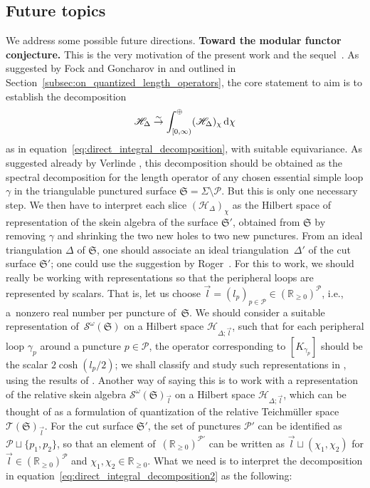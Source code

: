 \documentclass[10pt,a4paper]{amsart}
\numberwithin{equation}{section}
\theoremstyle{definition}
\begin{document}
\subsection{Future topics}\label{subsec:future_topics} We address some possible future directions.
{\bf Toward the modular functor conjecture.}
This is the very motivation of the present work and the sequel~\cite{sequel}. As suggested by Fock and Goncharov in \cite{FG09} and outlined in Section~\ref{subsec:on_quantized_length_operators}, the core statement to aim is to establish the decomposition
\begin{align}
\label{eq:direct_integral_decomposition2}
\mathscr{H}_\Delta \stackrel{\sim}{\to} \int_{[0,\infty)}^\oplus (\mathscr{H}_\Delta)_\chi \, {\rm d}\chi
\end{align}
as in equation~\eqref{eq:direct_integral_decomposition}, with suitable equivariance. As suggested already by Verlinde \cite{Verlinde}, this decomposition should be obtained as the spectral decomposition for the length operator  of any chosen essential simple loop $\gamma$ in the triangulable punctured surface $\mathfrak{S} = \Sigma\setminus \mathcal{P}$. But this is only one necessary step. We then have to interpret each slice $(\mathscr{H}_\Delta)_\chi$ as the Hilbert space of representation of the skein algebra of the surface $\mathfrak{S}'$, obtained from $\mathfrak{S}$ by removing $\gamma$ and shrinking the two new holes to two new punctures. From an ideal triangulation $\Delta$ of $\mathfrak{S}$, one should associate an ideal triangulation~$\Delta'$ of the cut surface $\mathfrak{S}'$; one could use the suggestion by Roger~\cite{Roger}. For this to work, we should really be working with representations so that the peripheral loops are represented by scalars. That is, let us choose $\vec{l} = (l_p)_{p \in \mathcal{P}} \in (\mathbb{R}_{\ge 0})^\mathcal{P}$, i.e., a~nonzero real number per puncture of~$\mathfrak{S}$. We should consider a suitable representation of~$\mathcal{S}^\omega(\mathfrak{S})$ on a Hilbert space $\mathscr{H}_{\Delta;\vec{l}}$, such that for each peripheral loop $\gamma_p$ around a puncture $p\in \mathcal{P}$, the operator corresponding to $[K_{\gamma_p}]$ should be the scalar $2\cosh(l_p/2)$; we shall classify and study such representations in \cite{sequel}, using the results of \cite{Kim_irreducible}. Another way of saying this is to work with a representation of the relative skein algebra $\mathcal{S}^\omega(\mathfrak{S})_{\vec{l}}$ on a Hilbert space $\mathscr{H}_{\Delta;\vec{l}}$, which can be thought of as a formulation of quantization of the relative Teichm\"uller space $\mathscr{T}(\mathfrak{S})_{\vec{l}}$. For the cut surface $\mathfrak{S}'$, the set of punctures $\mathcal{P}'$ can be identified as $\mathcal{P} \sqcup \{p_1,p_2\}$, so that an element of~$(\mathbb{R}_{\ge 0})^{\mathcal{P}'}$ can be written as $\vec{l} \sqcup (\chi_1,\chi_2)$ for $\vec{l} \in (\mathbb{R}_{\ge 0})^\mathcal{P}$ and $\chi_1,\chi_2 \in \mathbb{R}_{\ge 0}$. What we need is to interpret the decomposition in equation~\eqref{eq:direct_integral_decomposition2} as the following:
\end{document}
